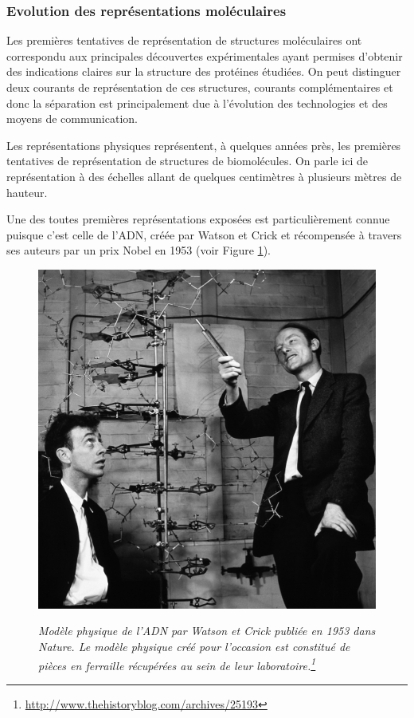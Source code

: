 \subsubsection{Evolution des représentations moléculaires}

Les premières tentatives de représentation de structures moléculaires ont correspondu aux principales découvertes expérimentales ayant permises d'obtenir des indications claires sur la structure des protéines étudiées. On peut distinguer deux courants de représentation de ces structures, courants complémentaires et donc la séparation est principalement due à l'évolution des technologies et des moyens de communication.



Les représentations physiques représentent, à quelques années près, les premières tentatives de représentation de structures de biomolécules. On parle ici de représentation à des échelles allant de quelques centimètres à plusieurs mètres de hauteur. 

Une des toutes premières représentations exposées est particulièrement connue puisque c'est celle de l'ADN, créée par Watson et Crick et récompensée à travers ses auteurs par un prix Nobel en 1953 \cite{watson1953molecular} (voir Figure \ref{Fig:watson_crick_dna_model}).

\begin{figure}[htb]
  \centering
  {\includegraphics[width=0.5\linewidth]{./figures/ch1/watson_crick_dna_model}}
    \caption[Modèle physique de l'ADN par Watson et Crick.]{\it Modèle physique de l'ADN par Watson et Crick publiée en 1953 dans \textit{Nature}. Le modèle physique créé pour l'occasion est constitué de pièces en ferraille récupérées au sein de leur laboratoire.\footnote{\url{http://www.thehistoryblog.com/archives/25193}}}
    \label{Fig:watson_crick_dna_model}
\end{figure}

